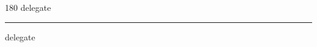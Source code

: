 
\begin{frame}
\begin{center}
\begin{turn}{180}
{\fontsize{2.5cm}{1em}\selectfont delegate}
\end{turn}
\vspace{1em}\par  
\hrule
\vspace{1em}\par  
{\fontsize{2.5cm}{1em}\selectfont delegate}
\end{center}
\end{frame}

